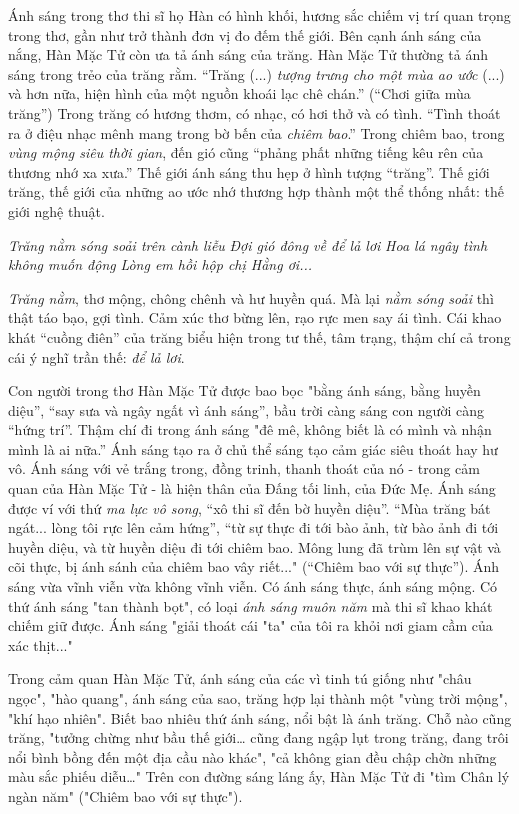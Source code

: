 \documentclass[../main.tex]{subfiles}
\begin{document}
\begin{multicols}{2}
Ánh sáng trong thơ thi sĩ họ Hàn có hình khối, hương sắc chiếm vị trí quan trọng trong thơ, gần như trở thành đơn vị đo đếm thế giới. Bên cạnh ánh sáng của nắng, Hàn Mặc Tử còn ưa tả ánh sáng của trăng. Hàn Mặc Tử thường tả ánh sáng trong trẻo của trăng rằm. “Trăng (...) \textit{tượng trưng cho một mùa ao ước} (...) và hơn nữa, hiện hình của một nguồn khoái lạc chê chán.” (“Chơi giữa mùa trăng”)  Trong trăng có hương thơm, có nhạc, có hơi thở và có tình. “Tình thoát ra ở điệu nhạc mênh mang trong bờ bến của \textit{chiêm bao}.” Trong chiêm bao, trong \textit{vùng mộng siêu thời gian}, đến gió cũng “phảng phất những tiếng kêu rên của thương nhớ xa xưa.” Thế giới ánh sáng thu hẹp ở hình tượng “trăng”. Thế giới trăng, thế giới của những ao ước nhớ thương hợp thành một thể thống nhất: thế giới nghệ thuật.  
 
\textit{Trăng nằm sóng soải trên cành liễu} 
\textit{Đợi gió đông về để lả lơi} 
\textit{Hoa lá ngây tình không muốn động} 
\textit{Lòng em hồi hộp chị Hằng ơi...} 
  
\textit{Trăng nằm}, thơ mộng, chông chênh và hư huyền quá. Mà lại \textit{nằm sóng soải} thì thật táo bạo, gợi tình. Cảm xúc thơ bừng lên, rạo rực men say ái tình. Cái khao khát “cuồng điên” của trăng biểu hiện trong  tư thế, tâm trạng, thậm chí cả trong cái ý nghĩ trần thế: \textit{để lả lơi}. 
 
Con người trong thơ Hàn Mặc Tử được bao bọc "bằng ánh sáng, bằng huyền diệu”, “say sưa và ngây ngất vì ánh sáng”, bầu trời càng sáng con người càng “hứng trí”. Thậm chí đi trong ánh sáng "đê mê, không biết là có mình và nhận mình là ai nữa.” Ánh sáng tạo ra ở chủ thể sáng tạo cảm giác siêu thoát hay hư vô. Ánh sáng với vẻ trắng trong, đồng trinh, thanh thoát của nó - trong cảm quan của Hàn Mặc Tử - là hiện thân của Đấng tối linh, của Đức Mẹ. Ánh sáng được ví với thứ \textit{ma lực vô song}, “xô thi sĩ đến bờ huyền diệu”. “Mùa trăng bát ngát... lòng tôi rực lên cảm hứng”, “từ sự thực đi tới bào ảnh, từ bào ảnh đi tới huyền diệu, và từ huyền diệu đi tới chiêm bao. Mông lung đã trùm lên sự vật và cõi thực, bị ánh sánh của chiêm bao vây riết..." (“Chiêm bao với sự thực”). Ánh sáng vừa vĩnh viễn vừa không vĩnh viễn. Có ánh sáng thực, ánh sáng mộng. Có thứ ánh sáng "tan thành bọt", có loại \textit{ánh sáng muôn năm} mà thi sĩ khao khát chiếm giữ được. Ánh sáng "giải thoát cái "ta" của tôi ra khỏi nơi giam cầm của xác thịt..." 
 
Trong cảm quan Hàn Mặc Tử, ánh sáng của các vì tinh tú giống như "châu ngọc", "hào quang", ánh sáng của sao, trăng hợp lại thành một "vùng trời mộng", "khí hạo nhiên". Biết bao nhiêu thứ ánh sáng, nổi bật là ánh trăng. Chỗ nào cũng trăng, "tưởng chừng như bầu thế giới… cũng đang ngập lụt trong trăng, đang trôi nổi bình bồng đến một địa cầu nào khác", "cả không gian đều chập chờn những màu sắc phiếu diễu…" Trên con đường sáng láng ấy, Hàn Mặc Tử đi "tìm Chân lý ngàn năm" ("Chiêm bao với sự thực"). 
 

\end{multicols}
\end{document}
